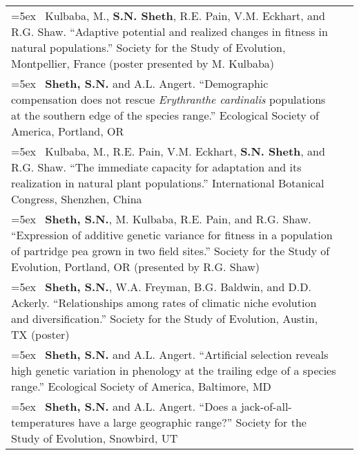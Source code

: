 \documentclass[11pt,english]{article}\usepackage[]{graphicx}\usepackage[]{xcolor}
\providecommand{\tabularnewline}{\\}
\begin{document}
\begin{tabularx}{\textwidth}{@{}>{\raggedright}p{5.25in} >{\raggedleft}X@{}}
\hangindent=5ex \ Kulbaba, M., \textbf{S.N. Sheth}, R.E. Pain, V.M. Eckhart, and R.G. Shaw. ``Adaptive potential and realized changes in fitness in natural populations.'' Society for the Study of Evolution, Montpellier, France (poster presented by M. Kulbaba) & 2018 \tabularnewline

\hangindent=5ex \ \textbf{Sheth, S.N.} and A.L. Angert. ``Demographic compensation does not rescue \textit{Erythranthe cardinalis} populations at the southern edge of the species range.'' Ecological Society of America, Portland, OR & 2017 \tabularnewline

\hangindent=5ex \ Kulbaba, M., R.E. Pain, V.M. Eckhart, \textbf{S.N. Sheth}, and R.G. Shaw. ``The immediate capacity for adaptation and its realization in natural plant populations.'' International Botanical Congress, Shenzhen, China & 2017 \tabularnewline

\hangindent=5ex \ \textbf{Sheth, S.N.}, M. Kulbaba, R.E. Pain, and R.G. Shaw. ``Expression of additive genetic variance for fitness in a population of partridge pea grown in two field sites.'' Society for the Study of Evolution, Portland, OR (presented by R.G. Shaw) & 2017 \tabularnewline

\hangindent=5ex \ \textbf{Sheth, S.N.}, W.A. Freyman, B.G. Baldwin, and D.D. Ackerly. ``Relationships among rates of climatic niche evolution and diversification.'' Society for the Study of Evolution, Austin, TX (poster) & 2016 \tabularnewline


\hangindent=5ex \ \textbf{Sheth, S.N.} and A.L. Angert. ``Artificial selection reveals high genetic variation in phenology at the trailing edge of a species range.'' Ecological Society of America, Baltimore, MD & 2015 \tabularnewline

\hangindent=5ex \ \textbf{Sheth, S.N.} and A.L. Angert. ``Does a jack-of-all-temperatures have a large geographic range?'' Society for the Study of Evolution, Snowbird, UT & 2013 \tabularnewline

\end{tabularx}
\end{document}
